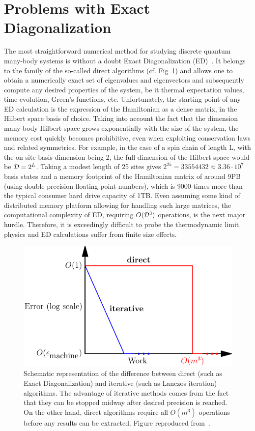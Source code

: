  \section{Problems with Exact Diagonalization}

 
 The most straightforward numerical method for studying discrete quantum many-body systems is without a doubt
 Exact Diagonalization (ED)~\autocite{Weisse2008}. It belongs to the family of the so-called direct algorithms (cf. Fig~\ref{fig:direct_iter})
 and allows one to obtain a numerically exact set of eigenvalues and eigenvectors and subsequently compute any desired properties
 of the system, be it thermal expectation values, time evolution, Green's functions, etc. Unfortunately, the starting point of any
 ED calculation is the expression of the Hamiltonian as a dense matrix, in the Hilbert space basis of choice. Taking into account
 the fact that the dimension many-body Hilbert space grows exponentially with the size of the system, the memory cost quickly becomes
 prohibitive, even when exploiting conservation laws and related symmetries. For example, in the case of a spin chain of length L, with 
 the on-site basis dimension being 2, the full dimension of the Hilbert space would be \(\mathcal{D} = 2^{L}\). Taking a modest length of 25 sites gives
 \(2^{25} = 33554432\approx 3.36 \cdot 10^7\) basis states and a memory footprint of the Hamiltonian matrix of around 9PB (using double-precision
 floating point numbers), which is 9000 times more than the typical consumer hard drive capacity of 1TB. Even assuming some kind of distributed
 memory platform allowing for handling such large matrices, the computational complexity of ED, requiring \(O(\mathcal{D}^3)\) operations,
 is the next major hurdle. Therefore, it is exceedingly
 difficult to probe the thermodynamic limit physics and ED calculations suffer from finite size effects.
 \vspace*{-0.5cm}
 \begin{figure}[H]
	\centering
	\includegraphics[width=0.8\linewidth]{Figures/direct_iterative.pdf}
	\caption{Schematic representation of the difference between direct (such as Exact Diagonalization) and
	iterative (such as Lanczos iteration) algorithms. The advantage of iterative methods comes from the fact that they
	can be stopped midway after desired precision is reached. On the other hand, direct algorithms require all \(O(m^3)\)
	operations before any results can be extracted. Figure reproduced from~\textcite{Trefethen1997}.}
	\label{fig:direct_iter}
\end{figure}
 
